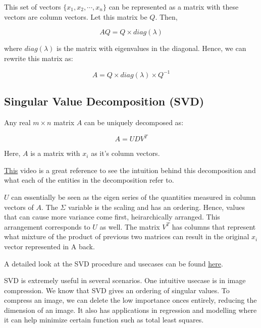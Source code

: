 This set of vectors $\{x_1, x_2, \cdots, x_n\}$ can be represented as a matrix with these vectors are column vectors. Let this matrix be $Q$. Then,

\begin{equation}
    AQ = Q\times diag(\lambda)
\end{equation}

where $diag(\lambda)$ is the matrix with eigenvalues in the diagonal. Hence, we can rewrite this matrix as:

\begin{equation}
    A = Q \times diag(\lambda) \times Q^{-1}
\end{equation}

\subsection{Singular Value Decomposition (SVD)}

Any real $m\times n$ matrix $A$ can be uniquely decomposed as:

\begin{equation}
    A = UDV^T
\end{equation}

Here, $A$ is a matrix with $x_i$ as it's column vectors.

\href{https://www.youtube.com/watch?v=nbBvuuNVfco}{This} video is a great reference to see the intuition behind this decomposition and what each of the entities in the decomposition refer to.

$U$ can essentially be seen as the eigen series of the quantities measured in column vectors of $A$. The $\Sigma$ variable is the scaling and has an ordering. Hence, values that can cause more variance come first, heirarchically arranged. This arrangement corresponds to $U$ as well. The matrix $V^T$ has columns that represent what mixture of the product of previous two matrices can result in the original $x_i$ vector represented in A back. 

A detailed look at the SVD procedure and usecases can be found \href{https://www.cse.unr.edu/~bebis/MathMethods/SVD/lecture.pdf}{here}.

SVD is extremely useful in several scenarios. One intuitive usecase is in image compression. We know that SVD gives an ordering of singular values. To compress an image, we can delete the low importance onces entirely, reducing the dimension of an image. It also has applications in regression and modelling where it can help minimize certain function such as total least squares.

